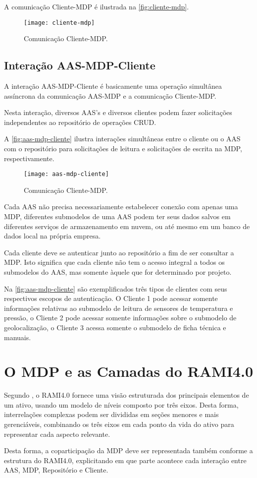 	A comunicação Cliente-MDP é ilustrada na \autoref{fig:cliente-mdp}.
	
	\begin{figure}[htb]
		\centering
		\caption{Comunicação Cliente-MDP.}
		\label{fig:cliente-mdp}
		\texttt{[image: cliente-mdp]}
	\end{figure}
	
	
\subsection{Interação AAS-MDP-Cliente}
	
	A interação AAS-MDP-Cliente é basicamente uma operação simultânea assíncrona da comunicação AAS-MDP e a comunicação Cliente-MDP.
	
	Nesta interação, diversos AAS's e diversos clientes podem fazer solicitações independentes ao repositório de operações CRUD.
	
	A \autoref{fig:aas-mdp-cliente} ilustra interações simultâneas entre o cliente ou o AAS com o repositório para solicitações de leitura e solicitações de escrita na MDP, respectivamente.
	
	\begin{figure}[htb]
		\centering
		\caption{Comunicação Cliente-MDP.}
		\label{fig:aas-mdp-cliente}
		\texttt{[image: aas-mdp-cliente]}
	\end{figure}

	Cada AAS não precisa necessariamente estabelecer conexão com apenas uma MDP, diferentes submodelos de uma AAS podem ter seus dados salvos em diferentes serviços de armazenamento em nuvem, ou até mesmo em um banco de dados local na própria empresa.
	
	Cada cliente deve se autenticar junto ao repositório a fim de ser consultar a MDP. Isto significa que cada cliente não tem o acesso integral a todos os submodelos do AAS, mas somente àquele que for determinado por projeto.
	
	Na \autoref{fig:aas-mdp-cliente} são exemplificados três tipos de clientes com seus respectivos escopos de autenticação. O Cliente 1 pode acessar somente informações relativas ao submodelo de leitura de sensores de temperatura e pressão, o Cliente 2 pode acessar somente informações sobre o submodelo de geolocalização, o Cliente 3 acessa somente o submodelo de ficha técnica e manuais.
	
	\section{O MDP e as Camadas do RAMI4.0}

	Segundo , o RAMI4.0 fornece uma visão estruturada dos principais elementos de um ativo, usando um modelo de níveis composto por três eixos. Desta forma, interrelações complexas podem ser divididas em seções menores e mais gerenciáveis, combinando os três eixos em cada ponto da vida do ativo para representar cada aspecto relevante.
	
	Desta forma, a coparticipação da MDP deve ser representada também conforme a estrutura do RAMI4.0, explicitando em que parte acontece cada interação entre AAS, MDP, Repositório e Cliente.
